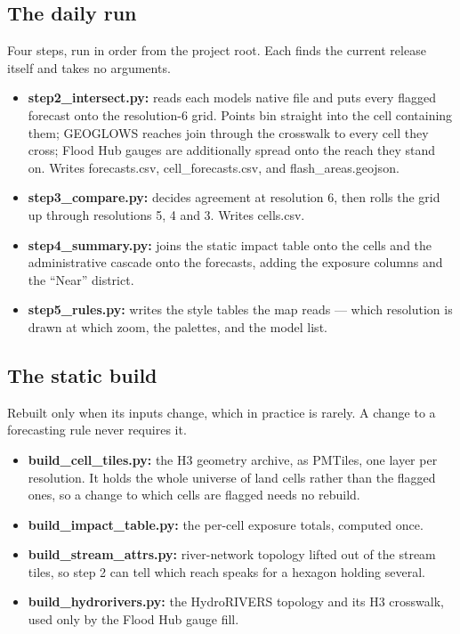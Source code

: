\subsection{The daily run}\label{the-daily-run}

Four steps, run in order from the project root.
Each finds the current release itself and takes no arguments.

\begin{itemize}
\item
  \textbf{step2\_intersect.py:} reads each model\textquotesingle s native file and puts every flagged forecast onto the resolution-6 grid. Points bin straight into the cell containing them; GEOGLOWS reaches join through the crosswalk to every cell they cross; Flood Hub gauges are additionally spread onto the reach they stand on. Writes forecasts.csv, cell\_forecasts.csv, and flash\_areas.geojson.
\item
  \textbf{step3\_compare.py:} decides agreement at resolution 6, then rolls the grid up through resolutions 5, 4 and 3. Writes cells.csv.
\item
  \textbf{step4\_summary.py:} joins the static impact table onto the cells and the administrative cascade onto the forecasts, adding the exposure columns and the ``Near'' district.
\item
  \textbf{step5\_rules.py:} writes the style tables the map reads --- which resolution is drawn at which zoom, the palettes, and the model list.
\end{itemize}

\subsection{The static build}\label{the-static-build}

Rebuilt only when its inputs change, which in practice is rarely.
A change to a forecasting rule never requires it.

\begin{itemize}
\item
  \textbf{build\_cell\_tiles.py:} the H3 geometry archive, as PMTiles, one layer per resolution. It holds the whole universe of land cells rather than the flagged ones, so a change to which cells are flagged needs no rebuild.
\item
  \textbf{build\_impact\_table.py:} the per-cell exposure totals, computed once.
\item
  \textbf{build\_stream\_attrs.py:} river-network topology lifted out of the stream tiles, so step 2 can tell which reach speaks for a hexagon holding several.
\item
  \textbf{build\_hydrorivers.py:} the HydroRIVERS topology and its H3 crosswalk, used only by the Flood Hub gauge fill.
\end{itemize}

